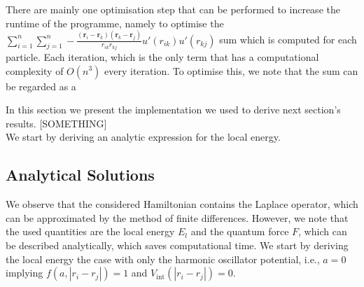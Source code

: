 \documentclass[11pt,a4paper]{article}
\numberwithin{equation}{section}
\begin{document}
There are mainly one optimisation step that can be performed to increase the runtime of the programme, namely to optimise the $\sum_{i=1}^n \sum_{j=1}^n -\frac{(\bm{r}_i - \bm{r}_k)(\bm{r}_k - \bm{r}_j)}{r_{ik}r_{kj}}u'(r_{ik})u'(r_{kj})$ sum which is computed for each particle. Each iteration, which is the only term that has a computational complexity of $O(n^3)$ every iteration. To optimise this, we note that the sum can be regarded as a 


In this section we present the implementation we used to derive next section's results. 
%
[SOMETHING]\\
We start by deriving an analytic expression for the local energy. 
\subsection{Analytical Solutions}
%
%
We observe that the considered Hamiltonian contains the Laplace operator, which can be approximated by the method of finite differences.
%
However, we note that the used quantities are the local energy $E_l$ and the quantum force $F$, which can be described analytically, which saves computational time. 
%
We start by deriving the local energy the case with only the harmonic oscillator potential, i.e., $a=0$ implying $f(a,|r_i-r_j|)=1$ and $V_{\mathrm{int}}(|r_i-r_j|)=0$.
%
\end{document}

